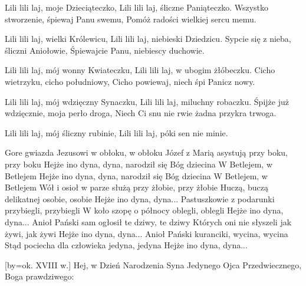         Lili lili laj, moje Dzieciąteczko,
        Lili lili laj, śliczne Paniąteczko.
\endverse
\beginverse
    Wszystko stworzenie, śpiewaj Panu swemu,
    Pomóż radości wielkiej sercu memu.

        Lili lili laj, wielki Królewicu,
        Lili lili laj, niebieski Dziedzicu.
\endverse
\beginverse
    Sypcie się z nieba, śliczni Aniołowie,
    Śpiewajcie Panu, niebiescy duchowie.

        Lili lili laj, mój wonny Kwiateczku,
        Lili lili laj, w ubogim żłóbeczku.
\endverse
\beginverse
    Cicho wietrzyku, cicho południowy,
    Cicho powiewaj, niech śpi Panicz nowy.

        Lili lili laj, mój wdzięczny Synaczku,
        Lili lili laj, miluchny robaczku.
\endverse
\beginverse
    Śpijże już wdzięcznie, moja perło droga,
    Niech Ci snu nie rwie żadna przykra trwoga.

        Lili lili laj, mój śliczny rubinie,
        Lili lili laj, póki sen nie minie.
\endverse
\endsong


\beginverse
Gore gwiazda Jezusowi w obłoku, w obłoku
Józef z Marią asystują przy boku, przy boku
\endverse
\beginchorus
Hejże ino dyna, dyna, narodził się Bóg dziecina
W Betlejem, w Betlejem
Hejże ino dyna, dyna, narodził się Bóg dziecina
W Betlejem, w Betlejem
\endchorus
\beginverse
Wół i osioł w parze służą przy żłobie, przy żłobie
Huczą, buczą delikatnej osobie, osobie
\endverse
\beginchorus
Hejże ino dyna, dyna...
\endchorus
\beginverse
Pastuszkowie z podarunki przybiegli, przybiegli
W koło szopę o północy oblegli, oblegli
\endverse
\beginchorus
Hejże ino dyna, dyna...
\endchorus
\beginverse
Anioł Pański sam ogłosił te dziwy, te dziwy
Których oni nie słyszeli jak żywi, jak żywi
\endverse
\beginchorus
Hejże ino dyna, dyna...
\endchorus
\beginverse
Anioł Pański kuranciki, wycina, wycina
Stąd pociecha dla człowieka jedyna, jedyna
\endverse
\beginchorus
Hejże ino dyna, dyna...
\endchorus
\endsong


[by={ok. XVIII w.}]
\beginverse
    Hej, w Dzień Narodzenia Syna Jedynego
    Ojca Przedwiecznego, Boga prawdziwego:
\endverse		

